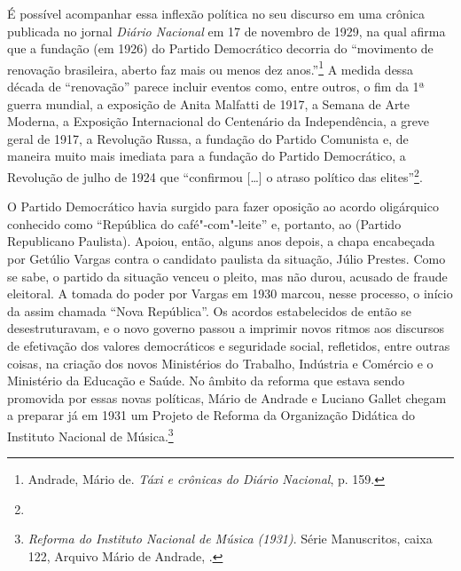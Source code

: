 É possível acompanhar essa inflexão política no seu discurso em uma
crônica publicada no jornal \emph{Diário Nacional} em 17 de novembro de
1929, na qual afirma que a fundação (em 1926) do Partido Democrático
decorria do ``movimento de renovação brasileira, aberto faz mais ou
menos dez anos.''\footnote{Andrade, Mário de. \emph{Táxi e crônicas do
  Diário Nacional}, p. 159.} A medida dessa década de ``renovação''
parece incluir eventos como, entre outros, o fim da 1ª guerra mundial, a
exposição de Anita Malfatti de 1917, a Semana de Arte Moderna, a
Exposição Internacional do Centenário da Independência, a greve geral de
1917, a Revolução Russa, a fundação do Partido Comunista e, de maneira
muito mais imediata para a fundação do Partido Democrático, a Revolução
de julho de 1924 que ``confirmou {[}\ldots{}{]} o atraso político das
elites''\footnote{}.

O Partido Democrático havia surgido para fazer oposição ao acordo
oligárquico conhecido como ``República do café"-com"-leite'' e, portanto,
ao  (Partido Republicano Paulista). Apoiou, então, alguns anos
depois, a chapa encabeçada por Getúlio Vargas contra o candidato
paulista da situação, Júlio Prestes. Como se sabe, o partido da situação
venceu o pleito, mas não durou, acusado de fraude eleitoral. A tomada do
poder por Vargas em 1930 marcou, nesse processo, o início da assim
chamada ``Nova República''. Os acordos estabelecidos de então se
desestruturavam, e o novo governo passou a imprimir novos ritmos aos
discursos de efetivação dos valores democráticos e seguridade social,
refletidos, entre outras coisas, na criação dos novos Ministérios do
Trabalho, Indústria e Comércio e o Ministério da Educação e Saúde. No
âmbito da reforma que estava sendo promovida por essas novas políticas,
Mário de Andrade e Luciano Gallet chegam a preparar já em 1931 um
Projeto de Reforma da Organização Didática do Instituto Nacional de
Música.\footnote{\emph{Reforma do Instituto Nacional de Música (1931)}.
  Série Manuscritos, caixa 122, Arquivo Mário de Andrade, .}

